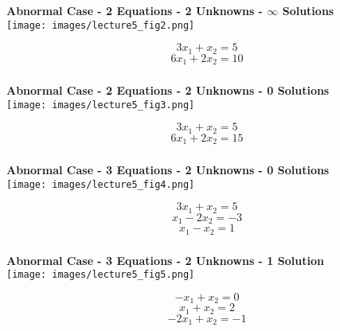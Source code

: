 \documentclass[fleqn]{beamer} %
\newcommand{\sectionIIIsubsectionIIItitle}{}
\begin{document}
			\begin{frame}
				\frametitle{\sectionIIIsubsectionIIItitle}
				\bigskip

				{\bf Abnormal Case - 2 Equations - 2 Unknowns - $\infty$ Solutions}  \\ \vspace{2mm}
				\texttt{[image: images/lecture5\_fig2.png]} \\
				\begin{fleqn}
					\[3x_1+x_2=5\]
					\[6x_1+2x_2=10\]
				\end{fleqn}

				\btVFill
			\end{frame}

			\begin{frame}
				\frametitle{\sectionIIIsubsectionIIItitle}
				\bigskip

				{\bf Abnormal Case - 2 Equations - 2 Unknowns - 0 Solutions} \\ \vspace{2mm}
				\texttt{[image: images/lecture5\_fig3.png]} \\
				\begin{fleqn}
					\[3x_1+x_2=5\]
					\[6x_1+2x_2=15\]
				\end{fleqn}

				\btVFill
			\end{frame}

			\begin{frame}
				\frametitle{\sectionIIIsubsectionIIItitle}
				\bigskip

				{\bf Abnormal Case - 3 Equations - 2 Unknowns - 0 Solutions} \\ \vspace{2mm}
				\texttt{[image: images/lecture5\_fig4.png]} \\
				\begin{fleqn}
				\[3x_1+x_2=5\]
				\[x_1-2x_2=-3\]
				\[x_1-x_2=1\]
				\end{fleqn}

				\btVFill
			\end{frame}

			\begin{frame}
				\frametitle{\sectionIIIsubsectionIIItitle}
				\bigskip

				{\bf Abnormal Case - 3 Equations - 2 Unknowns - 1 Solution} \\ \vspace{2mm}
				\texttt{[image: images/lecture5\_fig5.png]} \\
				\begin{fleqn}
				\[-x_1+x_2=0\]
				\[x_1+x_2=2\]
				\[-2x_1+x_2=-1\]
				\end{fleqn}

				\btVFill
			\end{frame}
\end{document}
